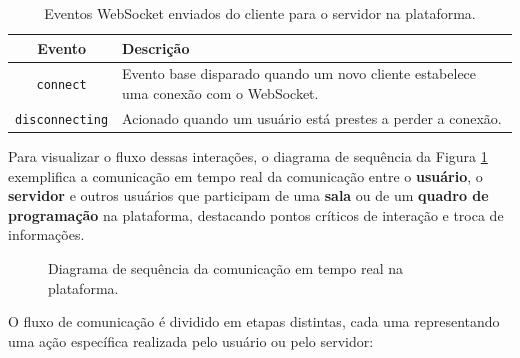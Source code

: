 \begin{table}[H]
    \centering
    \renewcommand{\arraystretch}{1.3} 
    \begin{tabular}{|c|p{10cm}|}
        \hline
        \textbf{Evento} & \textbf{Descrição} \\
        \hline
        \texttt{connect} & Evento base disparado quando um novo cliente estabelece uma conexão com o WebSocket. \\
        \hline
        \texttt{disconnecting} & Acionado quando um usuário está prestes a perder a conexão. \\
        \hline
    \end{tabular}
    \caption{Eventos WebSocket enviados do cliente para o servidor na plataforma.}
    \label{tab:websocket-server-control-events}
\end{table}


Para visualizar o fluxo dessas interações, o diagrama de sequência da Figura \ref{fig:websocket-flow} exemplifica a comunicação em tempo real da comunicação entre o \textbf{usuário}, o \textbf{servidor} e outros usuários que participam de uma \textbf{sala} ou de um \textbf{quadro de programação} na plataforma, destacando pontos críticos de interação e troca de informações.

\begin{figure}[H] 
    \centering
    \caption{Diagrama de sequência da comunicação em tempo real na plataforma.}
    \label{fig:websocket-flow}
\end{figure}

 O fluxo de comunicação é dividido em etapas distintas, cada uma representando uma ação específica realizada pelo usuário ou pelo servidor:

